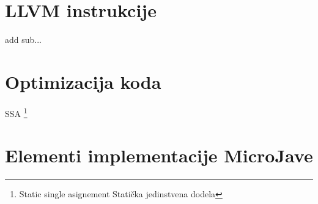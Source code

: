 \section{LLVM instrukcije}

add sub...

\section{Optimizacija koda}

SSA \footnote{\skr \eng Static single asignement \ndash Statička jedinstvena dodela}


\section{Elementi implementacije MicroJave}

